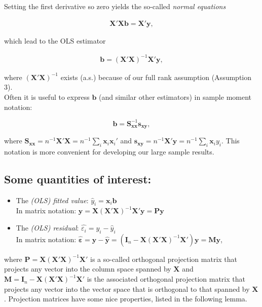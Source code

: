 \documentclass[
]{book}
\begin{document}
Setting the first derivative so zero yields the so-called \emph{normal
equations}

\begin{align*}
\mathbf{X}'\mathbf{X}\mathbf{b} = \mathbf{X}'\mathbf{y},
\end{align*}

which lead to the OLS estimator

\begin{align}
\mathbf{b} = (\mathbf{X}'\mathbf{X})^{-1}\mathbf{X}'\mathbf{y},
\label{eq:c3e7}
\end{align}

where \((\mathbf{X}'\mathbf{X})^{-1}\) exists (a.s.) because of our full
rank assumption (Assumption 3).\\
Often it is useful to express \(\mathbf{b}\) (and similar other
estimators) in sample moment notation:

\[\mathbf{b}=\mathbf{S}_{\mathbf{x}\mathbf{x}}^{-1}\mathbf{s}_{\mathbf{x}\mathbf{y}},\]

where
\(\mathbf{S}_{\mathbf{x}\mathbf{x}}=n^{-1}\mathbf{X}'\mathbf{X}=n^{-1}\sum_i\mathbf{x}_i\mathbf{x}_i'\)
and
\(\mathbf{s}_{\mathbf{x}\mathbf{y}}=n^{-1}\mathbf{X}'\mathbf{y}=n^{-1}\sum_i\mathbf{x}_iy_i\).
This notation is more convenient for developing our large sample
results.\\

\hypertarget{some-quantities-of-interest}{%
\subsection*{Some quantities of interest:}\label{some-quantities-of-interest}}

\begin{itemize}
\item
  The \emph{(OLS) fitted value}: \(\hat{y}_i=\mathbf{x}_i\mathbf{b}\)\\
  In matrix notation:
  \(\hat{\mathbf{y}}=\mathbf{X}(\mathbf{X}'\mathbf{X})^{-1}\mathbf{X}'\mathbf{y} = \mathbf{P}\mathbf{y}\)
\item
  The \emph{(OLS) residual}: \(\hat{\varepsilon_i}=y_i-\hat{y}_i\)\\
  In matrix notation:
  \(\hat{\boldsymbol{\varepsilon}} = \mathbf{y}-\hat{\mathbf{y}} = \left(\mathbf{I}_n-\mathbf{X}(\mathbf{X}'\mathbf{X})^{-1}\mathbf{X}'\right)\mathbf{y} = \mathbf{M}\mathbf{y}\),
\end{itemize}

where \(\mathbf{P}=\mathbf{X}(\mathbf{X}'\mathbf{X})^{-1}\mathbf{X}'\) is
a so-called orthogonal projection matrix that projects any vector into
the column space spanned by \(\mathbf{X}\) and
\(\mathbf{M}=\mathbf{I}_n-\mathbf{X}(\mathbf{X}'\mathbf{X})^{-1}\mathbf{X}'\)
is the associated orthogonal projection matrix that projects any vector
into the vector space that is orthogonal to that spanned by
\(\mathbf{X}\). Projection matrices have some nice properties, listed in
the following lemma.
\end{document}
